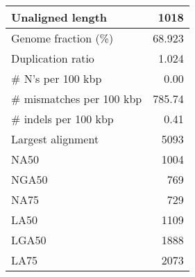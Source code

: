 \documentclass[12pt,a4paper]{article}
\begin{document}
\begin{table}[ht]
\begin{center}
\begin{tabular}{|l*{1}{|r}|}
Unaligned length & 1018 \\ \hline
Genome fraction (\%) & 68.923 \\ \hline
Duplication ratio & 1.024 \\ \hline
\# N's per 100 kbp & 0.00 \\ \hline
\# mismatches per 100 kbp & 785.74 \\ \hline
\# indels per 100 kbp & 0.41 \\ \hline
Largest alignment & 5093 \\ \hline
NA50 & 1004 \\ \hline
NGA50 & 769 \\ \hline
NA75 & 729 \\ \hline
LA50 & 1109 \\ \hline
LGA50 & 1888 \\ \hline
LA75 & 2073 \\ \hline
\end{tabular}
\end{center}
\end{table}
\end{document}
